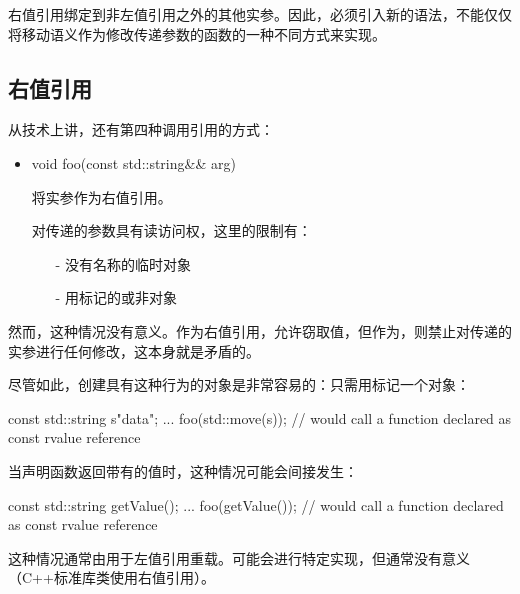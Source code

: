 右值引用绑定到非左值引用之外的其他实参。因此，必须引入新的语法，不能仅仅将移动语义作为修改传递参数的函数的一种不同方式来实现。

\subsection{右值引用}

从技术上讲，还有第四种调用引用的方式：

\begin{itemize}
	\item \begin{cppcode}
void foo(const std::string\&\& arg)
\end{cppcode}
	将实参作为右值引用。

	对传递的参数具有读访问权，这里的限制有：
	\begin{itemize}
		\item[-] 没有名称的临时对象
		\item[-] 用标记的或非对象
	\end{itemize}
\end{itemize}

然而，这种情况没有意义。作为右值引用，允许窃取值，但作为，则禁止对传递的实参进行任何修改，这本身就是矛盾的。

尽管如此，创建具有这种行为的对象是非常容易的：只需用标记一个对象：

\begin{cppcode}
const std::string s{"data"};
...
foo(std::move(s)); // would call a function declared as const rvalue reference
\end{cppcode}

当声明函数返回带有的值时，这种情况可能会间接发生：

\begin{cppcode}
const std::string getValue();
...
foo(getValue()); // would call a function declared as const rvalue reference
\end{cppcode}

这种情况通常由用于左值引用重载。可能会进行特定实现，但通常没有意义（C++标准库类使用右值引用）。




















































